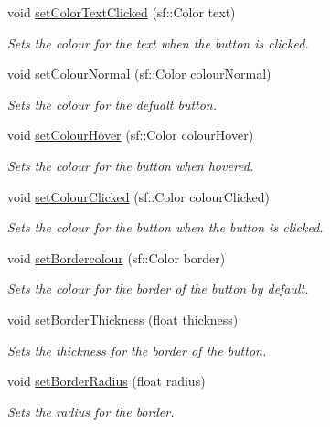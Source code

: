 \begin{DoxyCompactItemize}
void \hyperlink{class_create_button_a835d18ba262b902c7143966902082a68}{set\+Color\+Text\+Clicked} (sf\+::\+Color text)
\begin{DoxyCompactList}\small\item\em Sets the colour for the text when the button is clicked. \end{DoxyCompactList}\item 
void \hyperlink{class_create_button_a0f12c11a6a51c2cb2771acc1e85df3e5}{set\+Colour\+Normal} (sf\+::\+Color colour\+Normal)
\begin{DoxyCompactList}\small\item\em Sets the colour for the defualt button. \end{DoxyCompactList}\item 
void \hyperlink{class_create_button_a2fed0a4b7ffe6b274840d0c166547277}{set\+Colour\+Hover} (sf\+::\+Color colour\+Hover)
\begin{DoxyCompactList}\small\item\em Sets the colour for the button when hovered. \end{DoxyCompactList}\item 
void \hyperlink{class_create_button_af36c48ee1c7f440fba316e8e83b689b7}{set\+Colour\+Clicked} (sf\+::\+Color colour\+Clicked)
\begin{DoxyCompactList}\small\item\em Sets the colour for the button when the button is clicked. \end{DoxyCompactList}\item 
void \hyperlink{class_create_button_a084a70a22f429d4641d4f5f992315987}{set\+Bordercolour} (sf\+::\+Color border)
\begin{DoxyCompactList}\small\item\em Sets the colour for the border of the button by default. \end{DoxyCompactList}\item 
void \hyperlink{class_create_button_a727a1c1446d4a4b88a3f48346fcab044}{set\+Border\+Thickness} (float thickness)
\begin{DoxyCompactList}\small\item\em Sets the thickness for the border of the button. \end{DoxyCompactList}\item 
void \hyperlink{class_create_button_ae836b96adddce00e02cb38f503336ec1}{set\+Border\+Radius} (float radius)
\begin{DoxyCompactList}\small\item\em Sets the radius for the border. \end{DoxyCompactList}\item 

\end{DoxyCompactItemize}
